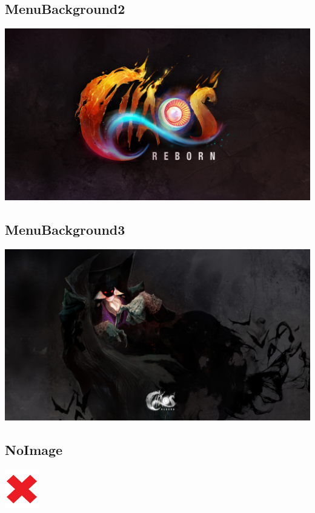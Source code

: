 \documentclass[a4paper,12pt]{scrartcl}
\begin{document}
	\subsection{MenuBackground2}
	\begin{center}\includegraphics{Prog2_EA_V2/Art/MenuBackground2.png}\end{center}
	\subsection{MenuBackground3}
	\begin{center}\includegraphics{Prog2_EA_V2/Art/MenuBackground3.png}\end{center}
	\subsection{NoImage}
	\begin{center}\includegraphics{Prog2_EA_V2/Art/NoImage.png}\end{center}
\end{document}
